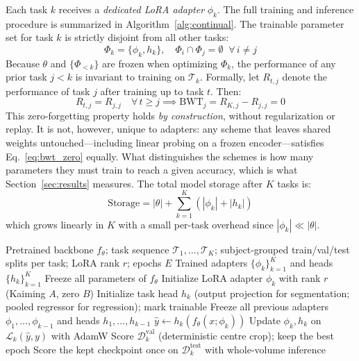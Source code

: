 \documentclass[journal,twoside,web]{ieeecolor}
\begin{document}
Each task $k$ receives a \emph{dedicated LoRA adapter} $\phi_k$. The full training and inference procedure is summarized in Algorithm~\ref{alg:continual}. The trainable parameter set for task $k$ is strictly disjoint from all other tasks:
\begin{equation}
\Phi_k = \{\phi_k, h_k\}, \quad \Phi_i \cap \Phi_j = \emptyset \;\; \forall \, i \neq j
\label{eq:disjoint}
\end{equation}
Because $\theta$ and $\{\Phi_{<k}\}$ are frozen when optimizing $\Phi_k$, the performance of any prior task $j < k$ is invariant to training on $\mathcal{T}_k$. Formally, let $R_{t,j}$ denote the performance of task $j$ after training up to task $t$. Then:
\begin{equation}
R_{t,j} = R_{j,j} \quad \forall \, t \geq j \implies \text{BWT}_j = R_{K,j} - R_{j,j} = 0
\label{eq:bwt_zero}
\end{equation}
This zero-forgetting property holds \emph{by construction}, without regularization or replay. It is not, however, unique to adapters: any scheme that leaves shared weights untouched---including linear probing on a frozen encoder---satisfies Eq.~\eqref{eq:bwt_zero} equally. What distinguishes the schemes is how many parameters they must train to reach a given accuracy, which is what Section~\ref{sec:results} measures. The total model storage after $K$ tasks is:
\begin{equation}
\text{Storage} = |\theta| + \sum_{k=1}^{K} (|\phi_k| + |h_k|)
\label{eq:storage}
\end{equation}
which grows linearly in $K$ with a small per-task overhead since $|\phi_k| \ll |\theta|$.

\begin{algorithm}[t]
\caption{Continual Learning via LoRA Adapter Isolation}
\label{alg:continual}
\begin{algorithmic}[1]
\REQUIRE Pretrained backbone $f_\theta$; task sequence $\mathcal{T}_1, \ldots, \mathcal{T}_K$; subject-grouped train/val/test splits per task; LoRA rank $r$; epochs $E$
\ENSURE Trained adapters $\{\phi_k\}_{k=1}^K$ and heads $\{h_k\}_{k=1}^K$
\STATE Freeze all parameters of $f_\theta$
    \STATE Initialize LoRA adapter $\phi_k$ with rank $r$ (Kaiming $A$, zero $B$)
    \STATE Initialize task head $h_k$ (output projection for segmentation; pooled regressor for regression); mark trainable
        \STATE Freeze all previous adapters $\phi_1, \ldots, \phi_{k-1}$ and heads $h_1, \ldots, h_{k-1}$
    \ENDIF
            \STATE $\hat{y} \leftarrow h_k(f_\theta(x; \phi_k))$
            \STATE Update $\phi_k, h_k$ on $\mathcal{L}_k(\hat{y}, y)$ with AdamW
        \ENDFOR
        \STATE Score $\mathcal{D}_k^{\text{val}}$ (deterministic centre crop); keep the best epoch
    \ENDFOR
    \STATE Score the kept checkpoint once on $\mathcal{D}_k^{\text{test}}$ with whole-volume inference
\ENDFOR
\end{algorithmic}
\end{algorithm}
\end{document}
